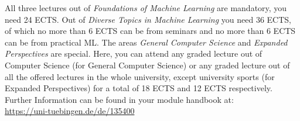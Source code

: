 All three lectures out of \emph{Foundations of Machine Learning} are mandatory, you need 24 ECTS. Out of \emph{Diverse Topics in Machine Learning} you need 36 ECTS, of which no more than 6 ECTS can be from seminars and no more than 6 ECTS can be from practical ML. The areas \emph{General Computer Science} and \emph{Expanded Perspectives} are special. Here, you can attend any graded lecture out of Computer Science (for General Computer Science) or any graded lecture out
of all the offered lectures in the whole university, except university sports (for Expanded Perspectives) for a total of 18 ECTS and 12 ECTS respectively.
Further Information can be found in your module handbook at:\\
\url{https://uni-tuebingen.de/de/135400}

\pagebreak
